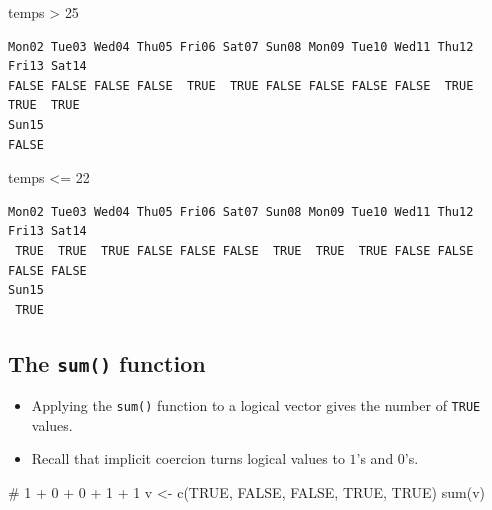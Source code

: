 \documentclass[
  letterpaper,
  DIV=11,
  numbers=noendperiod]{scrreprt}
\newenvironment{Shaded}{\begin{snugshade}}{\end{snugshade}}
\newcommand{\CommentTok}[1]{\textcolor[rgb]{0.37,0.37,0.37}{#1}}
\newcommand{\ConstantTok}[1]{\textcolor[rgb]{0.56,0.35,0.01}{#1}}
\newcommand{\DecValTok}[1]{\textcolor[rgb]{0.68,0.00,0.00}{#1}}
\newcommand{\FunctionTok}[1]{\textcolor[rgb]{0.28,0.35,0.67}{#1}}
\newcommand{\NormalTok}[1]{\textcolor[rgb]{0.00,0.23,0.31}{#1}}
\newcommand{\OtherTok}[1]{\textcolor[rgb]{0.00,0.23,0.31}{#1}}
\newcommand{\SpecialCharTok}[1]{\textcolor[rgb]{0.37,0.37,0.37}{#1}}
\begin{document}
\begin{tcolorbox}
\begin{Shaded}
\begin{Highlighting}[]
\NormalTok{temps }\SpecialCharTok{\textgreater{}} \DecValTok{25}
\end{Highlighting}
\end{Shaded}

\begin{verbatim}
Mon02 Tue03 Wed04 Thu05 Fri06 Sat07 Sun08 Mon09 Tue10 Wed11 Thu12 Fri13 Sat14 
FALSE FALSE FALSE FALSE  TRUE  TRUE FALSE FALSE FALSE FALSE  TRUE  TRUE  TRUE 
Sun15 
FALSE 
\end{verbatim}

\begin{Shaded}
\begin{Highlighting}[]
\NormalTok{temps }\SpecialCharTok{\textless{}=} \DecValTok{22}
\end{Highlighting}
\end{Shaded}

\begin{verbatim}
Mon02 Tue03 Wed04 Thu05 Fri06 Sat07 Sun08 Mon09 Tue10 Wed11 Thu12 Fri13 Sat14 
 TRUE  TRUE  TRUE FALSE FALSE FALSE  TRUE  TRUE  TRUE FALSE FALSE FALSE FALSE 
Sun15 
 TRUE 
\end{verbatim}

\end{tcolorbox}

\subsection{\texorpdfstring{The \texttt{sum()}
function}{The sum() function}}\label{the-sum-function}

\begin{itemize}
\item
  Applying the \texttt{sum()} function to a logical vector gives the
  number of \texttt{TRUE} values.
\item
  Recall that implicit coercion turns logical values to \(1\)'s and
  \(0\)'s.
\end{itemize}

\begin{Shaded}
\begin{Highlighting}[]
\CommentTok{\# 1 + 0 + 0 + 1 + 1 }
\NormalTok{v }\OtherTok{\textless{}{-}} \FunctionTok{c}\NormalTok{(}\ConstantTok{TRUE}\NormalTok{, }\ConstantTok{FALSE}\NormalTok{, }\ConstantTok{FALSE}\NormalTok{, }\ConstantTok{TRUE}\NormalTok{, }\ConstantTok{TRUE}\NormalTok{)}
\FunctionTok{sum}\NormalTok{(v)}
\end{Highlighting}
\end{Shaded}
\end{document}

